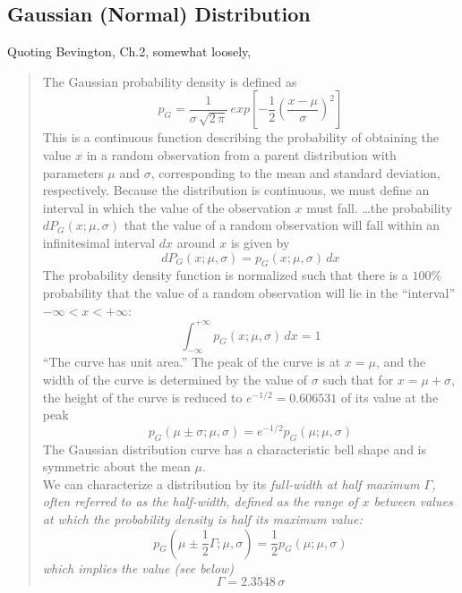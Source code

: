 \documentclass[12pt]{article}
\begin{document}
\subsection{Gaussian (Normal) Distribution}
\noindent  Quoting Bevington, Ch.2, somewhat loosely,
\begin{quote}
The Gaussian probability density is defined as
\begin{equation}
 p_G = \frac{1}{\sigma\,\sqrt{2\,\pi}}\,exp \left[-\frac{1}{2}\left(\frac{x-\mu}{\sigma}\right)^2\right]
\end{equation}
This is a continuous function describing the probability of obtaining the value
  $x$ in a random observation from a parent distribution with parameters $\mu$
  and $\sigma$, corresponding to the mean and standard deviation, respectively.
Because the distribution is continuous, we must define an interval in which the
   value of the observation $x$ must fall.
\ldots  the probability $dP_G(x;\mu,\sigma)$ that the value of a random observation
  will fall within an infinitesimal interval $dx$ around $x$ is given by
\begin{equation}
  dP_G(x;\mu,\sigma) = p_G(x;\mu,\sigma)\,dx
\end{equation}  
The probability density function is normalized such that there is a $100\%$
  probability that the value of a random observation will lie in the ``interval''
   $-\infty < x < +\infty$:  
\begin{equation}
     \int_{-\infty}^{+\infty} p_G(x;\mu,\sigma)\,dx = 1
\end{equation}
``The curve has unit area.''
The peak of the curve is at $x = \mu$, and the width of the curve is determined
  by the value of $\sigma$ such that for $x = \mu + \sigma$, the height of
  the curve is reduced to $e^{-1/2} = 0.606531$ of its value at the peak
\begin{equation}
  p_G(\mu \pm \sigma; \mu,\sigma) = e^{-1/2} p_G(\mu; \mu,\sigma)
\end{equation}
The Gaussian distribution curve has a characteristic bell shape and
  is symmetric about the mean $\mu$.\\
  
\noindent We can characterize a distribution by its \it full-width at half
  maximum \rm $\Gamma$, often referred to as the \it half-width,\rm
  defined as the range of $x$ between values at which the probability
   density is half its maximum value:
\begin{equation}
  p_G(\mu \pm \frac{1}{2} \Gamma; \mu,\sigma) = \frac{1}{2} p_G(\mu; \mu,\sigma)
\end{equation}   
  which implies the value (see below)
\begin{equation}
  \Gamma = 2.3548\,\sigma
\end{equation}  
\end{quote}
\end{document}
